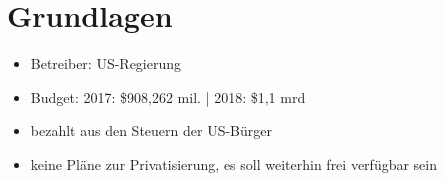 \section{Grundlagen}
\label{sec:grundlagen}

\begin{itemize}
    \item Betreiber: US-Regierung
    \item Budget: 2017: \$908,262 mil. | 2018: \$1,1 mrd
    \item bezahlt aus den Steuern der US-Bürger
    \item keine Pläne zur Privatisierung, es soll weiterhin frei verfügbar sein
\end{itemize}
